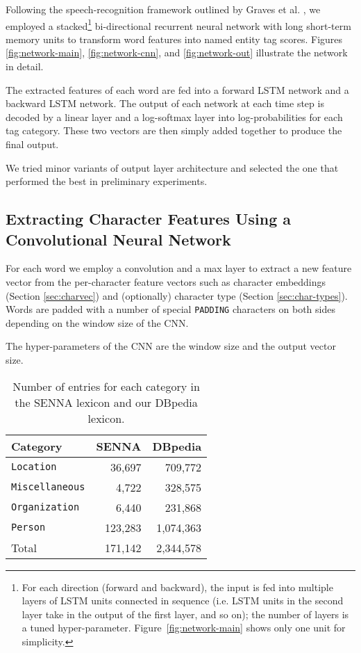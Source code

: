 \documentclass[11pt,letterpaper]{article}
\begin{document}
Following the speech-recognition framework outlined by Graves et al. , we employed a stacked\footnote{For each direction (forward and backward), the input is fed into multiple layers of LSTM units connected in sequence (i.e. LSTM units in the second layer take in the output of the first layer, and so on); the number of layers is a tuned hyper-parameter. Figure~\ref{fig:network-main} shows only one unit for simplicity.} bi-directional recurrent neural network with long short-term memory units to transform word features into named entity tag scores.  Figures \ref{fig:network-main}, \ref{fig:network-cnn}, and \ref{fig:network-out} illustrate the network in detail.

The extracted features of each word are fed into a forward LSTM network and a backward LSTM network.
The output of each network at each time step is decoded by a linear layer and a log-softmax layer into log-probabilities for each tag category. These two vectors are then simply added together to produce the final output.

We tried minor variants of output layer architecture and selected the one that performed the best in preliminary experiments.

\hspace{-20mm}

\subsection{Extracting Character Features Using a Convolutional Neural Network}

For each word we employ a convolution and a max layer to extract a new feature vector from the per-character feature vectors such as character embeddings (Section \ref{sec:charvec}) and (optionally) character type (Section \ref{sec:char-types}). Words are padded with a number of special {\tt PADDING} characters on both sides depending on the window size of the CNN. 

The hyper-parameters of the CNN are the window size and the output vector size.

\begin{table}[t]
\begin{center}
\begin{tabular}{|l|r|r|}
\hline \bf Category & \bf SENNA & \bf DBpedia \\ \hline
{\tt Location} & 36,697 & 709,772 \\
{\tt Miscellaneous} & 4,722 & 328,575 \\
{\tt Organization} & 6,440 & 231,868 \\
{\tt Person} & 123,283 & 1,074,363 \\ \hline
Total & 171,142 & 2,344,578 \\
\hline
\end{tabular}
\end{center}
\caption{Number of entries for each category in the SENNA lexicon and our DBpedia lexicon.}
\label{tab:lexicon}
\end{table}
\end{document}
